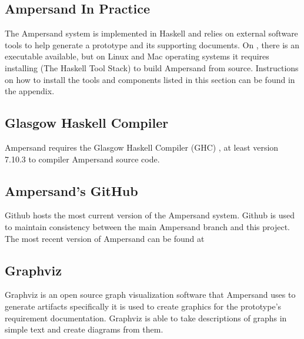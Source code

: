 \documentclass[journal,12pt,onecolumn,draftclsnofoot]{report}
\let\Oldsubsection\subsection
\renewcommand{\subsection}{\FloatBarrier\Oldsubsection}
\begin{document}


\subsection{Ampersand In Practice}

The \gls{Ampersand} system is implemented in Haskell and relies on external software 
tools to help generate a \gls{prototype} and its supporting documents.
On , 
there is an executable available, but on Linux and Mac operating systems it 
requires installing  (The Haskell Tool Stack)
to build \gls{Ampersand} from source. 
Instructions on how to install the tools and components listed in this section 
can be found in the appendix.

\subsection*{Glasgow Haskell Compiler}

Ampersand requires the Glasgow Haskell Compiler (GHC) \cite{ghcUserGuide}, at least version 
7.10.3 to compiler \gls{Ampersand} source code. 

\subsection*{Ampersand's GitHub}\label{Github}

Github hosts the most current version of the \gls{Ampersand} system. Github is used 
to maintain consistency between the main \gls{Ampersand} branch and this project. The 
most recent version of \gls{Ampersand} can be found at 
\cite{ampersandGit}

\subsection*{Graphviz}

Graphviz \cite{graphviz}
 is an open source graph visualization software that \gls{Ampersand} uses to generate 
 artifacts specifically it is used to create graphics for the prototype's 
 requirement documentation. Graphviz is able to take descriptions of graphs in 
 simple text and create diagrams from them. 
\end{document}
